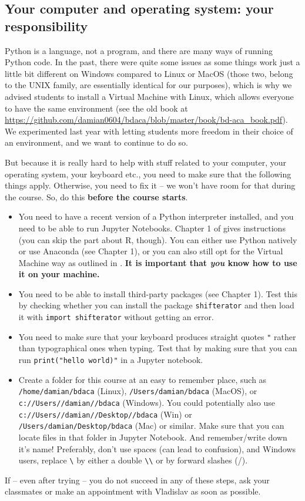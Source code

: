 \documentclass[a4paper,10pt,twocolumn]{report}
\newenvironment{corona}{%
	\begin{shaded*}%
	}{%
	\end{shaded*}%
}
\begin{document}
\begin{corona}
\section{Your computer and operating system: your responsibility}	
Python is a language, not a program, and there are many ways of running Python code. In the past, there were quite some issues as some things work just a little bit different on Windows compared to Linux or MacOS (those two, belong to the UNIX family, are essentially identical for our purposes), which is why we advised students to install a Virtual Machine with Linux, which allows everyone to have the same environment (see the old book at \url{https://github.com/damian0604/bdaca/blob/master/book/bd-aca_book.pdf}). We experimented last year with letting students more freedom in their choice of an environment, and we want to continue to do so.

But because it is really hard to help with stuff related to your computer, your operating system, your keyboard etc., you need to make sure that the following things apply. Otherwise, you need to fix it -- we won't have room for that during the course. So, do this \textbf{before the course starts}.

\begin{itemize}
	\item You need to have a recent version of a Python interpreter installed, and you need to be able to run Jupyter Notebooks. Chapter 1 of \cite{cssbook} gives instructions (you can skip the part about R, though). You can either use Python natively or use Anaconda (see Chapter 1), or you can also still opt for the Virtual Machine way as outlined in \cite{Trilling2016}. \textbf{It is important that \emph{you} know how to use it on your machine.}
	\item You need to be able to install third-party packages (see Chapter 1). Test this by checking whether you can install the package \texttt{shifterator} and then load it with \texttt{import shifterator} without getting an error.
	\item You need to make sure that your keyboard produces straight quotes \texttt{"} rather than typographical ones when typing. Test that by making sure that you can run \texttt{print("hello world)"} in a Jupyter notebook.
	\item Create a folder for this course at an easy to remember place, such as \texttt{/home/damian/bdaca} (Linux), \texttt{/Users/damian/bdaca} (MacOS), or \texttt{c://Users//damian//bdaca} (Windows). You could potentially also use \texttt{c://Users//damian//Desktop//bdaca} (Win) or \texttt{/Users/damian/Desktop/bdaca} (Mac) or similar. Make sure that you can locate files in that folder in Jupyter Notebook. And remember/write down it's name! Preferably, don't use spaces (can lead to confusion), and Windows users, replace \texttt{\textbackslash} by either a double \texttt{\textbackslash \textbackslash} or by forward slashes (/).
\end{itemize}
If -- even after trying -- you do not succeed in any of these steps, ask your classmates or make an appointment with Vladislav as soon as possible.



\end{corona}
\end{document}
